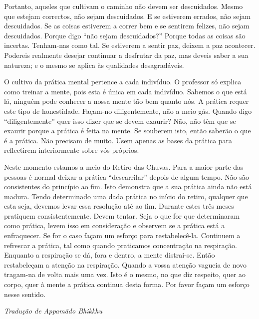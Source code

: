 Portanto, aqueles que cultivam o caminho não devem ser descuidados.
Mesmo que estejam correctos, não sejam descuidados. E se estiverem
errados, não sejam descuidados. Se as coisas estiverem a correr bem e se
sentirem felizes, não sejam descuidados. Porque digo ``não sejam
descuidados?'' Porque todas as coisas são incertas. Tenham-nas como tal.
Se estiverem a sentir paz, deixem a paz acontecer. Podereis realmente
desejar continuar a desfrutar da paz, mas deveis saber a sua natureza; e
o mesmo se aplica às qualidades desagradáveis.

O cultivo da prática mental pertence a cada indivíduo. O professor só
explica como treinar a mente, pois esta é única em cada indivíduo.
Sabemos o que está lá, ninguém pode conhecer a nossa mente tão bem
quanto nós. A prática requer este tipo de honestidade. Façam-no
diligentemente, não a meio gás. Quando digo ``diligentemente'' quer isso
dizer que se devem exaurir? Não, não têm que se exaurir porque a prática
é feita na mente. Se souberem isto, então saberão o que é a prática. Não
precisam de muito. Usem apenas as bases da prática para reflectirem
interiormente sobre vós próprios.

Neste momento estamos a meio do Retiro das Chuvas. Para a maior parte
das pessoas é normal deixar a prática ``descarrilar'' depois de algum
tempo. Não são consistentes do princípio ao fim. Isto demonstra que a
sua prática ainda não está madura. Tendo determinado uma dada prática no
início do retiro, qualquer que esta seja, devemos levar essa resolução
até ao fim. Durante estes três meses pratiquem consistentemente. Devem
tentar. Seja o que for que determinaram como prática, levem isso em
consideração e observem se a prática está a enfraquecer. Se for o caso
façam um esforço para restabelecê-la. Continuem a refrescar a prática,
tal como quando praticamos concentração na respiração. Enquanto a
respiração se dá, fora e dentro, a mente distrai-se. Então restabeleçam
a atenção na respiração. Quando a vossa atenção vagueia de novo
tragam-na de volta mais uma vez. Isto é o mesmo, no que diz respeito,
quer ao corpo, quer à mente a prática continua desta forma. Por favor
façam um esforço nesse sentido.

\bigskip

{\raggedleft\itshape
  Tradução de Appamādo Bhikkhu
\par}
